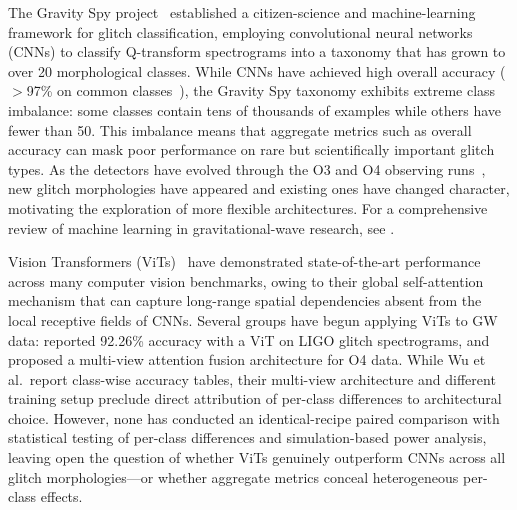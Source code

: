 \documentclass[12pt]{article}
\begin{document}
The Gravity Spy project~\citep{Zevin2017} established a citizen-science and
machine-learning framework for glitch classification, employing convolutional
neural networks (CNNs) to classify Q-transform spectrograms into a taxonomy
that has grown to over 20 morphological classes.
While CNNs have achieved high overall accuracy ($>$97\% on common
classes~\citep{George2018}), the Gravity Spy taxonomy exhibits extreme class
imbalance: some classes contain tens of thousands of examples while others have
fewer than 50.
This imbalance means that aggregate metrics such as overall accuracy can mask
poor performance on rare but scientifically important glitch types.
As the detectors have evolved through the O3 and O4 observing
runs~\citep{Zevin2024, LIGOO4DetChar2024}, new glitch morphologies have
appeared and existing ones have changed character, motivating the exploration
of more flexible architectures.
For a comprehensive review of machine learning in gravitational-wave
research, see \citet{Cuoco2025}.

Vision Transformers (ViTs)~\citep{Dosovitskiy2021} have demonstrated
state-of-the-art performance across many computer vision benchmarks, owing to
their global self-attention mechanism that can capture long-range spatial
dependencies absent from the local receptive fields of CNNs.
Several groups have begun applying ViTs to GW data:
\citet{Srivastava2025} reported 92.26\% accuracy with a ViT on LIGO glitch
spectrograms, and \citet{Wu2024} proposed a multi-view attention fusion
architecture for O4 data.
While Wu et al.\ report class-wise accuracy tables, their multi-view
architecture and different training setup preclude direct attribution of
per-class differences to architectural choice.
However, none has conducted an identical-recipe paired comparison with
statistical testing of per-class differences and simulation-based power
analysis, leaving open the question of whether
ViTs genuinely outperform CNNs across all glitch morphologies---or whether
aggregate metrics conceal heterogeneous per-class effects.
\end{document}
